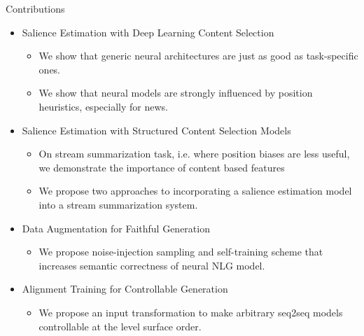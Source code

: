 \begin{frame}{Contributions}
    \begin{itemize}
        \item Salience Estimation with Deep Learning Content Selection
            \begin{itemize}
                \item We show that generic neural architectures are 
                    just as good as task-specific ones.
                \item We show that neural models are strongly influenced by  position heuristics, especially for news.
            \end{itemize}
        \item Salience Estimation with Structured Content Selection Models 
            \begin{itemize}
                \item  On stream summarization task, i.e. where position biases are less useful, we demonstrate the importance of content based features
                \item We propose two approaches to incorporating a salience estimation model into a stream summarization system.
            \end{itemize}
        \item Data Augmentation for Faithful Generation
        \begin{itemize}
            \item We propose noise-injection sampling and self-training scheme that increases semantic correctness of neural NLG model.
        \end{itemize}
        \item Alignment Training for Controllable Generation
        \begin{itemize}
            \item We propose an input transformation to make arbitrary seq2seq models controllable at the level surface order.
        \end{itemize}
    \end{itemize}
\end{frame}

